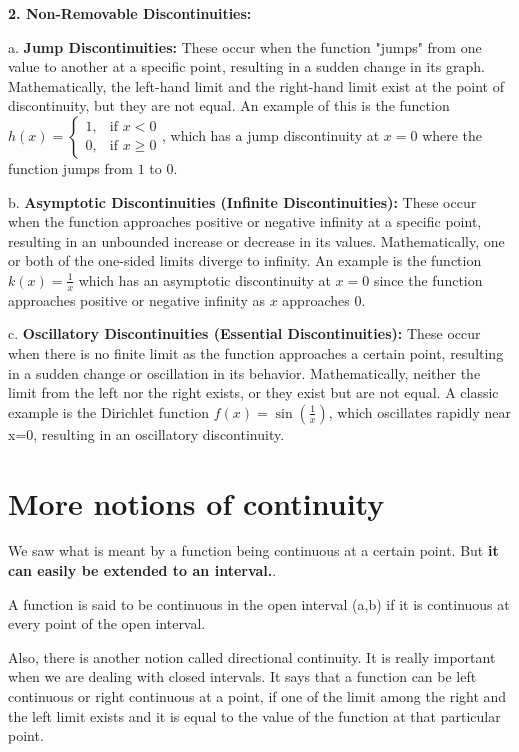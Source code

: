 \textbf{2. Non-Removable Discontinuities:}

   a. \textbf{Jump Discontinuities:} These occur when the function "jumps" from one value to another at a specific point, resulting in a sudden change in its graph. Mathematically, the left-hand limit and the right-hand limit exist at the point of discontinuity, but they are not equal. An example of this is the function \( h(x) = \begin{cases} 1, & \text{if } x < 0 \\ 0, & \text{if } x \geq 0 \end{cases} \), which has a jump discontinuity at \( x = 0 \) where the function jumps from \( 1 \) to \( 0 \).

   b. \textbf{Asymptotic Discontinuities (Infinite Discontinuities):} These occur when the function approaches positive or negative infinity at a specific point, resulting in an unbounded increase or decrease in its values. Mathematically, one or both of the one-sided limits diverge to infinity. An example is the function \( k(x) = \frac{1}{x} \) which has an asymptotic discontinuity at \( x = 0 \) since the function approaches positive or negative infinity as \( x \) approaches \( 0 \).

   c. \textbf{Oscillatory Discontinuities (Essential Discontinuities):} These occur when there is no finite limit as the function approaches a certain point, resulting in a sudden change or oscillation in its behavior. Mathematically, neither the limit from the left nor the right exists, or they exist but are not equal. A classic example is the Dirichlet function \(f(x)=\sin(\frac{1}{x})\), which oscillates rapidly near x=0, resulting in an oscillatory discontinuity.



\section{More notions of continuity}

We saw what is meant by a function being continuous at a certain point. But \textbf{it can easily be extended to an interval.}. 

\begin{outline}
    A function is said to be continuous in the open interval (a,b) if it is continuous at every point of the open interval. 
\end{outline}

Also, there is another notion called directional continuity. It is really important when we are dealing with closed intervals. It says that a function can be left continuous or right continuous at a point, if one of the limit among the right and the left limit exists and it is equal to the value of the function at that particular point. 

